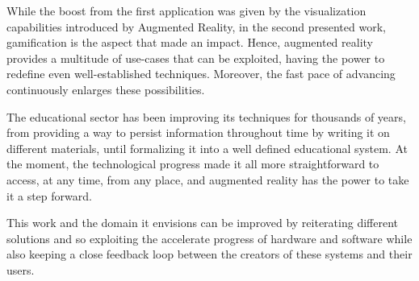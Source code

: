\documentclass[12 pct]{report}
\begin{document}
While the boost from the first application was given by the visualization capabilities introduced by Augmented Reality, in the second presented work, gamification is the aspect that made an impact. Hence, augmented reality provides a multitude of use-cases that can be exploited, having the power to redefine even well-established techniques. Moreover, the fast pace of advancing continuously enlarges these possibilities.

The educational sector has been improving its techniques for thousands of years, from providing a way to persist information throughout time by writing it on different materials, until formalizing it into a well defined educational system. At the moment, the technological progress made it all more straightforward to access, at any time, from any place, and augmented reality has the power to take it a step forward.

This work and the domain it envisions can be improved by reiterating different solutions and so exploiting the accelerate progress of hardware and software while also keeping a close feedback loop between the creators of these systems and their users.



 
\end{document}
